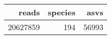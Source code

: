 \begin{longtable}{rrr}
  \hline
reads & species & asvs \\ 
  \hline
20627859 & 194 & 56993 \\ 
   \hline
\hline
\end{longtable}
